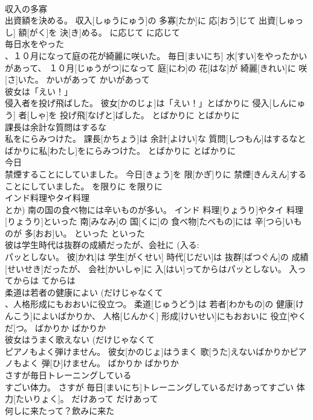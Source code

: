 \documentclass[8pt]{extreport}
\begin{document}
\begin{CJK}{UTF8}{min}
\\	収入の多寡 
\\	出資額を決める。	収入[しゅうにゅう]の 多寡[たか]に 応[おう]じて 出資[しゅっし] 額[がく]を 決[き]める。	に応じて	に応じて	
\\	毎日水をやった 
\\	、１０月になって庭の花が綺麗に咲いた。	毎日[まいにち] 水[すい]をやったかいがあって、 １０月[じゅうがつ]になって 庭[にわ]の 花[はな]が 綺麗[きれい]に 咲[さ]いた。	かいがあって	かいがあって~	
\\	彼女は「えい！」
\\	侵入者を投げ飛ばした。	彼女[かのじょ]は「えい！」とばかりに 侵入[しんにゅう] 者[しゃ]を 投げ飛[なげと]ばした。	とばかりに	とばかりに	
\\	課長は余計な質問はするな 
\\	私をにらみつけた。	課長[かちょう]は 余計[よけい]な 質問[しつもん]はするなとばかりに私[わたし]をにらみつけた。	とばかりに	とばかりに	
\\	今日 
\\	禁煙することにしていました。	今日[きょう]を 限[かぎ]りに 禁煙[きんえん]することにしていました。	を限りに	を限りに	
\\	インド料理やタイ料理 
\\	とか) 南の国の食べ物には辛いものが多い。	インド 料理[りょうり]やタイ 料理[りょうり]といった 南[みなみ]の 国[くに]の 食べ物[たべもの]には 辛[つら]いものが 多[おお]い。	といった	といった	
\\	彼は学生時代は抜群の成績だったが、会社に (入る: 
\\	パッとしない。	彼[かれ]は 学生[がくせい] 時代[じだい]は 抜群[ばつぐん]の 成績[せいせき]だったが、 会社[かいしゃ]に 入[はい]ってからはパッとしない。	入ってからは	てからは	
\\	柔道は若者の健康によい (だけじゃなくて 
\\	、人格形成にもおおいに役立つ。	柔道[じゅうどう]は 若者[わかもの]の 健康[けんこう]によいばかりか、 人格[じんかく] 形成[けいせい]にもおおいに 役立[やくだ]つ。	ばかりか	ばかりか	
\\	彼女はうまく歌えない (だけじゃなくて 
\\	ピアノもよく弾けません。	彼女[かのじょ]はうまく 歌[うた]えないばかりかピアノもよく 弾[ひ]けません。	ばかりか	ばかりか	
\\	さすが毎日トレーニングしている 
\\	すごい体力。	さすが 毎日[まいにち]トレーニングしているだけあってすごい 体力[たいりょく]。	だけあって	だけあって	
\\	何しに来たって？飲みに来た 

\end{CJK}
\end{document}
